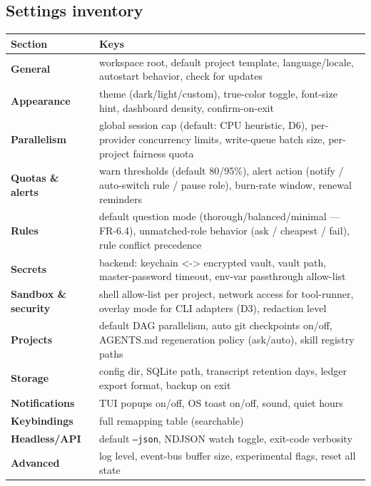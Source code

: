 \documentclass[10pt,a4paper]{article}
\begin{document}
\subsection{Settings inventory}
\begin{small}
\begin{tabularx}{\linewidth}{lX}
\toprule
Section & Keys \\
\midrule
\textbf{General} & workspace root, default project template, language/locale, autostart behavior, check for updates \\
\textbf{Appearance} & theme (dark/light/custom), true-color toggle, font-size hint, dashboard density, confirm-on-exit \\
\textbf{Parallelism} & global session cap (default: CPU heuristic, D6), per-provider concurrency limits, write-queue batch size, per-project fairness quota \\
\textbf{Quotas \& alerts} & warn thresholds (default 80/95\%), alert action (notify / auto-switch rule / pause role), burn-rate window, renewal reminders \\
\textbf{Rules} & default question mode (thorough/balanced/minimal — FR-6.4), unmatched-role behavior (ask / cheapest / fail), rule conflict precedence \\
\textbf{Secrets} & backend: keychain <-> encrypted vault, vault path, master-password timeout, env-var passthrough allow-list \\
\textbf{Sandbox \& security} & shell allow-list per project, network access for tool-runner, overlay mode for CLI adapters (D3), redaction level \\
\textbf{Projects} & default DAG parallelism, auto git checkpoints on/off, AGENTS.md regeneration policy (ask/auto), skill registry paths \\
\textbf{Storage} & config dir, SQLite path, transcript retention days, ledger export format, backup on exit \\
\textbf{Notifications} & TUI popups on/off, OS toast on/off, sound, quiet hours \\
\textbf{Keybindings} & full remapping table (searchable) \\
\textbf{Headless/API} & default \texttt{--json}, NDJSON watch toggle, exit-code verbosity \\
\textbf{Advanced} & log level, event-bus buffer size, experimental flags, reset all state \\
\bottomrule
\end{tabularx}
\end{small}
\end{document}

